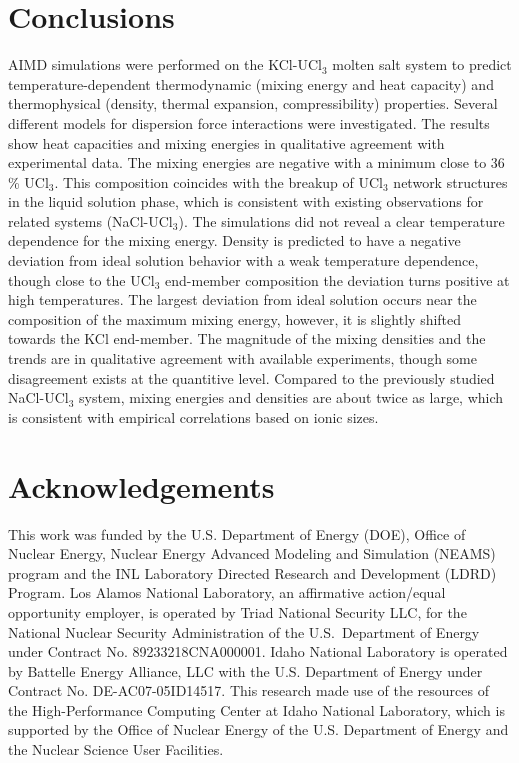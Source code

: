 \documentclass[preprint,3p,10pt,twocolumn,number,sort&compress]{elsarticle}
\begin{document}
\section{Conclusions}
\label{sec:conclusions}
AIMD simulations were performed on the KCl-UCl$_3$ molten salt system to predict temperature-dependent thermodynamic (mixing energy and heat capacity) and thermophysical (density, thermal expansion, compressibility) properties. Several different models for dispersion force interactions were investigated. The results show heat capacities and mixing energies in qualitative agreement with experimental data. The mixing energies are negative with a minimum close to 36 \% UCl$_3$. This composition coincides with the breakup of UCl$_3$ network structures in the liquid solution phase, which is consistent with existing observations for related systems (NaCl-UCl$_3$). The simulations did not reveal a clear temperature dependence for the mixing energy. 
Density is predicted to have a negative deviation from ideal solution behavior with a weak temperature dependence, though close to the UCl$_3$ end-member composition the deviation turns positive at high temperatures. The largest deviation from ideal solution occurs near the composition of the maximum mixing energy, however, it is slightly shifted towards the KCl end-member. The magnitude of the mixing densities and the trends are in qualitative agreement with available experiments, though some disagreement exists at the quantitive level. Compared to the previously studied NaCl-UCl$_3$ system, mixing energies and densities are about twice as large, which is consistent with empirical correlations based on ionic sizes. 


\section*{Acknowledgements}
This work was funded by the U.S. Department of Energy (DOE), Office of Nuclear Energy, Nuclear Energy Advanced Modeling and Simulation (NEAMS) program and the INL Laboratory Directed Research and Development (LDRD) Program. Los Alamos National Laboratory, an affirmative action/equal opportunity employer, is operated by Triad National Security LLC, for the National Nuclear Security Administration of the U.S.\ Department of Energy under Contract No. 89233218CNA000001. Idaho National Laboratory is operated by Battelle Energy Alliance, LLC with the U.S. Department of Energy under Contract No. DE-AC07-05ID14517. This research made use of the resources of the High-Performance Computing Center at Idaho National Laboratory, which is supported by the Office of Nuclear Energy of the U.S. Department of Energy and the Nuclear Science User Facilities.       


 

\end{document}
